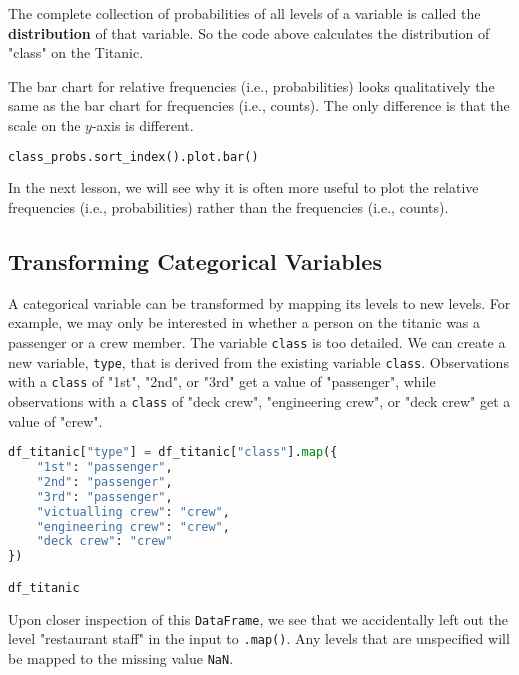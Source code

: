 The complete collection of probabilities of all levels of a variable is called the \textbf{distribution} of that variable. So the code above calculates the distribution of "class" on the Titanic.



The bar chart for relative frequencies (i.e., probabilities) looks qualitatively the same as the bar chart for frequencies (i.e., counts). The only difference is that the scale on the $y$-axis is different.

\begin{lstlisting}[language=Python]
class_probs.sort_index().plot.bar()
\end{lstlisting}




In the next lesson, we will see why it is often more useful to plot the relative frequencies (i.e., probabilities) rather than the frequencies (i.e., counts).



\subsection{Transforming Categorical Variables}\label{2.1.1}

A categorical variable can be transformed by mapping its levels to new levels. For example, we may only be interested in whether a person on the titanic was a passenger or a crew member. The variable \verb|class| is too detailed. We can create a new variable, \verb|type|, that is derived from the existing variable \verb|class|. Observations with a \verb|class| of "1st", "2nd", or "3rd" get a value of "passenger", while observations with a \verb|class| of "deck crew", "engineering crew", or "deck crew" get a value of "crew".

\begin{lstlisting}[language=Python]
df_titanic["type"] = df_titanic["class"].map({
    "1st": "passenger",
    "2nd": "passenger",
    "3rd": "passenger",
    "victualling crew": "crew",
    "engineering crew": "crew",
    "deck crew": "crew"
})

df_titanic
\end{lstlisting}




Upon closer inspection of this \verb|DataFrame|, we see that we accidentally left out the level "restaurant staff" in the input to \verb|.map()|. Any levels that are unspecified will be mapped to the missing value \verb|NaN|.

